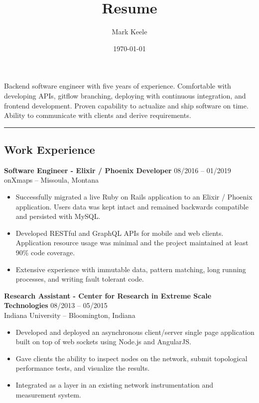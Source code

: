 \documentclass[12pt,letterpaper]{article}
\author{Mark Keele}
\title{Resume}
\date{\today}
\begin{document}
Backend software engineer with five years of experience. Comfortable with developing APIs, gitflow branching, deploying with continuous integration, and frontend development. Proven capability to actualize and ship software on time. Ability to communicate with clients and derive requirements.

\noindent\rule{7.5in}{0.4pt}

\subsection*{Work Experience}

\noindent\textbf{Software Engineer - Elixir / Phoenix Developer}
\hfill{08/2016 -- 01/2019} \\
onXmaps -- Missoula, Montana

\begin{itemize}

  \item Successfully migrated a live Ruby on Rails application to an Elixir / Phoenix application. Users data was kept intact and remained backwards compatible and persisted with MySQL.

  \item Developed RESTful and GraphQL APIs for mobile and web clients. Application resource usage was minimal and the project maintained at least 90\% code coverage.

  \item Extensive experience with immutable data, pattern matching, long running processes, and writing fault tolerant code.

\end{itemize}

\noindent\textbf{Research Assistant - Center for Research in Extreme Scale Technologies}
\hfill{08/2013 -- 05/2015} \\
Indiana University -- Bloomington, Indiana

\begin{itemize}

  \item Developed and deployed an asynchronous client/server single page application
  built on top of web sockets using Node.js and AngularJS.

  \item Gave clients the ability to inspect nodes on the network, submit topological performance tests, and visualize the results.

  \item Integrated as a layer in an existing network instrumentation and
  measurement system.

\end{itemize}
\end{document}
